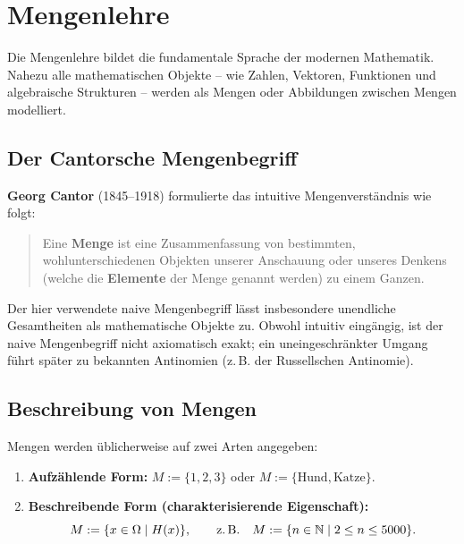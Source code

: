 ﻿%

\section{Mengenlehre}


Die Mengenlehre bildet die fundamentale Sprache der modernen Mathematik. Nahezu alle mathematischen Objekte -- wie Zahlen, Vektoren, Funktionen und algebraische Strukturen -- werden als Mengen oder Abbildungen zwischen Mengen modelliert.

\subsection{Der Cantorsche Mengenbegriff}

\begin{definition}
\textbf{Georg Cantor} (1845--1918) formulierte das intuitive Mengenverständnis wie folgt:
\begin{quote}
    \glqq Eine \textbf{Menge} ist eine Zusammenfassung von bestimmten, wohlunterschiedenen Objekten unserer Anschauung oder unseres Denkens (welche die \textbf{Elemente} der Menge genannt werden) zu einem Ganzen.\grqq
\end{quote}
\end{definition}

\begin{bemerkung}
Der hier verwendete naive Mengenbegriff lässt insbesondere unendliche Gesamtheiten als mathematische Objekte zu. Obwohl intuitiv eingängig, ist der naive Mengenbegriff nicht axiomatisch exakt; ein uneingeschränkter Umgang führt später zu bekannten Antinomien (z.\,B. der Russellschen Antinomie).
\end{bemerkung}

\subsection*{Beschreibung von Mengen}
Mengen werden üblicherweise auf zwei Arten angegeben:
\begin{enumerate}
    \item \textbf{Aufzählende Form:} $M := \{1, 2, 3\}$ oder $M := \{\text{Hund}, \text{Katze}\}$.
    \item \textbf{Beschreibende Form (charakterisierende Eigenschaft):} 
    \[
    M := \{x \in \Omega \mid H(x)\}, \qquad \text{z.\,B.} \quad M := \{n \in \mathbb{N} \mid 2 \le n \le 5000\}.
    \]
\end{enumerate}

